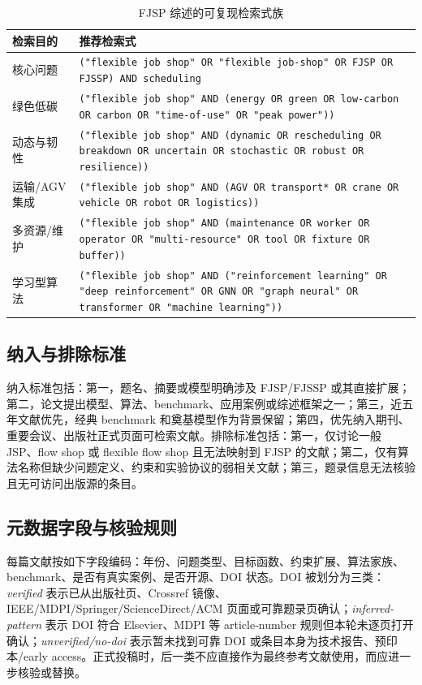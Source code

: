 \documentclass[UTF8,a4paper,11pt]{ctexart}
\begin{document}
\begin{table}[H]
\centering
\caption{FJSP 综述的可复现检索式族}
\label{tab:search-string}
\begin{tabularx}{\textwidth}{p{3.1cm}Y}
\toprule
检索目的 & 推荐检索式 \\
\midrule
核心问题 & \texttt{("flexible job shop" OR "flexible job-shop" OR FJSP OR FJSSP) AND scheduling} \\
绿色低碳 & \texttt{("flexible job shop" AND (energy OR green OR low-carbon OR carbon OR "time-of-use" OR "peak power"))} \\
动态与韧性 & \texttt{("flexible job shop" AND (dynamic OR rescheduling OR breakdown OR uncertain OR stochastic OR robust OR resilience))} \\
运输/AGV 集成 & \texttt{("flexible job shop" AND (AGV OR transport* OR crane OR vehicle OR robot OR logistics))} \\
多资源/维护 & \texttt{("flexible job shop" AND (maintenance OR worker OR operator OR "multi-resource" OR tool OR fixture OR buffer))} \\
学习型算法 & \texttt{("flexible job shop" AND ("reinforcement learning" OR "deep reinforcement" OR GNN OR "graph neural" OR transformer OR "machine learning"))} \\
\bottomrule
\end{tabularx}
\end{table}

\subsection{纳入与排除标准}

纳入标准包括：第一，题名、摘要或模型明确涉及 FJSP/FJSSP 或其直接扩展；第二，论文提出模型、算法、benchmark、应用案例或综述框架之一；第三，近五年文献优先，经典 benchmark 和奠基模型作为背景保留；第四，优先纳入期刊、重要会议、出版社正式页面可检索文献。排除标准包括：第一，仅讨论一般 JSP、flow shop 或 flexible flow shop 且无法映射到 FJSP 的文献；第二，仅有算法名称但缺少问题定义、约束和实验协议的弱相关文献；第三，题录信息无法核验且无可访问出版源的条目。

\subsection{元数据字段与核验规则}

每篇文献按如下字段编码：年份、问题类型、目标函数、约束扩展、算法家族、benchmark、是否有真实案例、是否开源、DOI 状态。DOI 被划分为三类：\emph{verified} 表示已从出版社页、Crossref 镜像、IEEE/MDPI/Springer/ScienceDirect/ACM 页面或可靠题录页确认；\emph{inferred-pattern} 表示 DOI 符合 Elsevier、MDPI 等 article-number 规则但本轮未逐页打开确认；\emph{unverified/no-doi} 表示暂未找到可靠 DOI 或条目本身为技术报告、预印本/early access。正式投稿时，后一类不应直接作为最终参考文献使用，而应进一步核验或替换。
\end{document}
